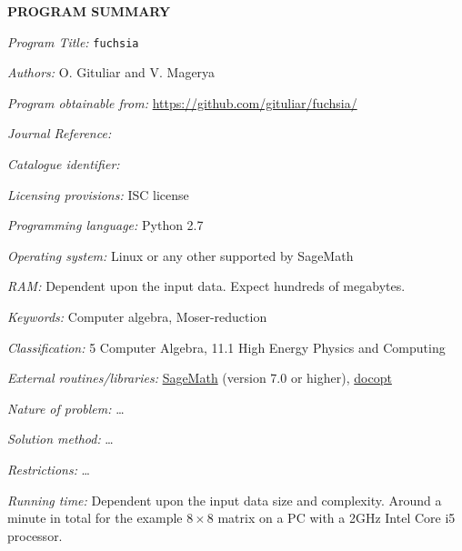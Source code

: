 {\bf PROGRAM SUMMARY}

\begin{small}
\noindent

{\em Program Title:}
    \texttt{fuchsia}

{\em Authors:}
    O. Gituliar and V. Magerya

{\em Program obtainable from:}
    \url{https://github.com/gituliar/fuchsia/}

{\em Journal Reference:}

{\em Catalogue identifier:}

{\em Licensing provisions:}
    ISC license

{\em Programming language:}
    Python 2.7

{\em Operating system:}
    Linux or any other supported by SageMath

{\em RAM:}
    Dependent upon the input data. Expect hundreds of megabytes.

{\em Keywords:}
    Computer algebra, Moser-reduction

{\em Classification:}
    5 Computer Algebra, 11.1 High Energy Physics and Computing

{\em External routines/libraries:}
    \href{http://www.sagemath.org/}{SageMath} (version 7.0 or higher),
    \href{https://pypi.python.org/pypi/docopt/}{docopt}

{\em Nature of problem:} \ldots

{\em Solution method:} \ldots

{\em Restrictions:} \ldots

{\em Running time:}
    Dependent upon the input data size and complexity. Around
    a minute in total for the example $8\times8$ matrix on a PC
    with a 2GHz Intel Core i5 processor.

\end{small}
